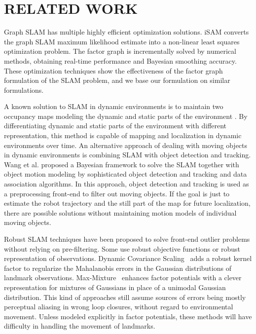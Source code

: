 \section{RELATED WORK}

Graph SLAM has multiple highly efficient optimization solutions.
iSAM \cite{isam} converts the graph SLAM maximum likelihood estimate into a
non-linear least squares optimization problem.  The factor graph is incrementally solved by numerical methods, obtaining real-time performance and Bayesian smoothing accuracy. These optimization techniques show the effectiveness of the factor graph formulation of the SLAM problem, and we base our formulation on similar formulations.


A known solution to SLAM in dynamic environments is to maintain two occupancy
maps modeling the dynamic and static parts of the environment \cite{wolf05}. By
differentiating dynamic and static parts of the environment with different
representation, this method is capable of mapping and localization in dynamic
environments over time. An alternative approach of dealing with
moving objects in dynamic environments is combining SLAM with
object detection and tracking. Wang et al. \cite{wang2003online} proposed a Bayesian
framework to solve the SLAM together with object motion modeling by
sophisticated object detection and tracking and data association algorithms.
In this approach, object detection and tracking is used as a preprocessing
front-end to filter out moving objects. 
If the goal is just to estimate the
robot trajectory and the still part of the map for future localization, there
are possible solutions without maintaining motion models of individual moving objects.

Robust SLAM techniques have been proposed to solve front-end outlier problems
without relying on pre-filtering. Some use robust objective functions or robust
representation of observations. Dynamic Covariance Scaling~\cite{DCS} adds a
robust kernel factor to regularize the Mahalanobis errors in the Gaussian
distributions of landmark observations.  Max-Mixture~\cite{mm} enhances factor
potentials with a clever representation for mixtures of Gaussians in place of a unimodal Gaussian distribution. This kind of approaches still assume sources of errors being mostly perceptual aliasing in wrong loop closures, without regard to
environmental movement.  Unless modeled explicitly in factor potentials, these methods will have difficulty in handling the movement of landmarks.

